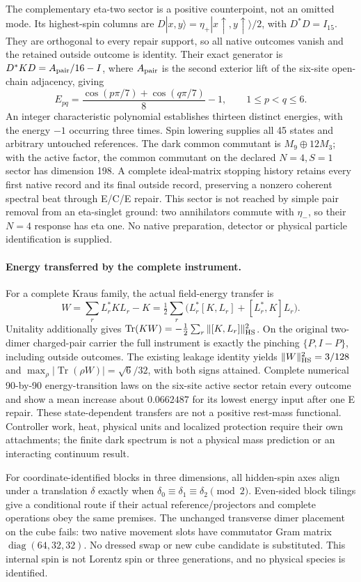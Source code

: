 The complementary eta-two sector is a positive counterpoint, not an
omitted mode.  Its highest-spin columns are
$D|x,y\rangle=\eta_+|x\uparrow,y\uparrow\rangle/2$, with
$D^*D=I_{15}$.  They are orthogonal to every repair support, so all native
outcomes vanish and the retained outside outcome is identity.  Their
exact generator is $D^*KD=A_{\rm pair}/16-I$, where $A_{\rm pair}$ is
the second exterior lift of the six-site open-chain adjacency, giving
\[
 E_{pq}=\frac{\cos(p\pi/7)+\cos(q\pi/7)}8-1,
 \qquad 1\leq p<q\leq6.
\]
An integer characteristic polynomial establishes thirteen distinct
energies, with the energy $-1$ occurring three times.  Spin lowering
supplies all 45 states and arbitrary untouched references.  The dark
common commutant is $M_9\oplus12M_3$; with the active factor, the
common commutant on the declared $N=4,S=1$ sector has dimension 198.
A complete ideal-matrix stopping history retains every first native
record and its final outside record, preserving a nonzero coherent
spectral beat through E/C/E repair.  This sector is not reached
by simple pair removal from an eta-singlet ground: two annihilators
commute with $\eta_-$, so their $N=4$ response has eta one.  No native
preparation, detector or physical particle identification is supplied.

\paragraph{Energy transferred by the complete instrument.}
For a complete Kraus family, the actual field-energy transfer is
\[
 W=\sum_rL_r^*KL_r-K
 =\tfrac12\sum_r\bigl(L_r^*[K,L_r]+[L_r^*,K]L_r\bigr).
\]
Unitality additionally gives
$\operatorname{Tr}(KW)=-\tfrac12\sum_r\|[K,L_r]\|_{\rm HS}^2$.
On the original two-dimer charged-pair carrier the full instrument is
exactly the pinching $\{P,I-P\}$, including outside outcomes.  The
existing leakage identity yields
$\|W\|_{\rm HS}^2=3/128$ and
$\max_\rho|\operatorname{Tr}(\rho W)|=\sqrt6/32$, with both signs
attained.  Complete numerical 90-by-90 energy-transition laws on the
six-site active sector retain every outcome and show a mean increase
about $0.0662487$ for its lowest energy input after one E repair.
These state-dependent transfers are not a positive rest-mass functional.
Controller work, heat, physical units and localized protection require
their own attachments; the finite dark spectrum is not a physical mass
prediction or an interacting continuum result.

For coordinate-identified blocks in three dimensions, all hidden-spin
axes align under a translation $\delta$ exactly when
$\delta_0\equiv\delta_1\equiv\delta_2\pmod2$.  Even-sided block tilings
give a conditional route if their actual reference/projectors and
complete operations obey the same premises.  The unchanged transverse
dimer placement on the cube fails: two native movement slots have
commutator Gram matrix $\operatorname{diag}(64,32,32)$.  No dressed
swap or new cube candidate is substituted.  This internal spin is not
Lorentz spin or three generations, and no physical species is identified.

